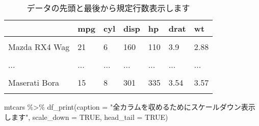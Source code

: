 \documentclass[a4paper,14pt]{tufte-handout}
\newenvironment{Shaded}{}{}
\newcommand{\AttributeTok}[1]{\textcolor[rgb]{0.49,0.56,0.16}{#1}}
\newcommand{\ConstantTok}[1]{\textcolor[rgb]{0.53,0.00,0.00}{#1}}
\newcommand{\FunctionTok}[1]{\textcolor[rgb]{0.02,0.16,0.49}{#1}}
\newcommand{\NormalTok}[1]{#1}
\newcommand{\SpecialCharTok}[1]{\textcolor[rgb]{0.25,0.44,0.63}{#1}}
\newcommand{\StringTok}[1]{\textcolor[rgb]{0.25,0.44,0.63}{#1}}
\begin{document}
\begin{table}

\caption{\label{tab:unnamed-chunk-1}データの先頭と最後から規定行数表示します}
\centering
\begin{tabular}[t]{lllllll}
\toprule
  & mpg & cyl & disp & hp & drat & wt\\
\midrule
\cellcolor{gray!6}{Mazda RX4} & \cellcolor{gray!6}{21} & \cellcolor{gray!6}{6} & \cellcolor{gray!6}{160} & \cellcolor{gray!6}{110} & \cellcolor{gray!6}{3.9} & \cellcolor{gray!6}{2.62}\\
Mazda RX4 Wag & 21 & 6 & 160 & 110 & 3.9 & 2.88\\
\cellcolor{gray!6}{Datsun 710} & \cellcolor{gray!6}{22.8} & \cellcolor{gray!6}{4} & \cellcolor{gray!6}{108} & \cellcolor{gray!6}{93} & \cellcolor{gray!6}{3.85} & \cellcolor{gray!6}{2.32}\\
... & ... & ... & ... & ... & ... & ...\\
\cellcolor{gray!6}{Ferrari Dino} & \cellcolor{gray!6}{19.7} & \cellcolor{gray!6}{6} & \cellcolor{gray!6}{145} & \cellcolor{gray!6}{175} & \cellcolor{gray!6}{3.62} & \cellcolor{gray!6}{2.77}\\
\addlinespace
Maserati Bora & 15 & 8 & 301 & 335 & 3.54 & 3.57\\
\cellcolor{gray!6}{Volvo 142E} & \cellcolor{gray!6}{21.4} & \cellcolor{gray!6}{4} & \cellcolor{gray!6}{121} & \cellcolor{gray!6}{109} & \cellcolor{gray!6}{4.11} & \cellcolor{gray!6}{2.78}\\
\bottomrule
\end{tabular}
\end{table}

\begin{Shaded}
\begin{Highlighting}[numbers=left,,]
\NormalTok{mtcars }\SpecialCharTok{\%\textgreater{}\%} 
  \FunctionTok{df\_print}\NormalTok{(}\AttributeTok{caption =} \StringTok{"全カラムを収めるためにスケールダウン表示します"}\NormalTok{,}
           \AttributeTok{scale\_down =} \ConstantTok{TRUE}\NormalTok{, }\AttributeTok{head\_tail =} \ConstantTok{TRUE}\NormalTok{)}
\end{Highlighting}
\end{Shaded}
\end{document}
